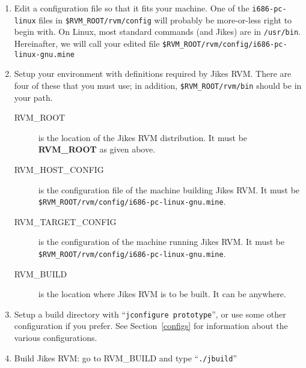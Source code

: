 \begin{enumerate}
\item Edit a configuration file so that it fits your machine.  One of
the {\tt i686-pc-linux} files in {\tt \$RVM\_ROOT/rvm/config} will probably be
more-or-less right to begin with.  On Linux, most standard commands
(and Jikes) are in {\tt /usr/bin}.  Hereinafter, we will call your edited
file {\tt \$RVM\_ROOT/rvm/config/i686-pc-linux-gnu.mine}

\item Setup your environment with definitions required by Jikes RVM.
There are four of these that you must use; in addition,
{\tt \$RVM\_ROOT/rvm/bin} should be in your path.
\begin{description}

\item[RVM\_ROOT] is the location of the Jikes RVM distribution.  It
must be {\bf RVM\_ROOT} as given above.

\item[RVM\_HOST\_CONFIG] is the configuration file of the machine
building Jikes RVM.  It must be
{\tt \$RVM\_ROOT/rvm/config/i686-pc-linux-gnu.mine}.

\item[RVM\_TARGET\_CONFIG] is the configuration of the machine running
Jikes RVM.  It must be {\tt \$RVM\_ROOT/rvm/config/i686-pc-linux-gnu.mine}.

\item[RVM\_BUILD] is the location where Jikes RVM is to be built.  It
can be anywhere.
\end{description}

\item Setup a build directory with ``{\tt jconfigure prototype}'', or
use some other configuration if you prefer. See Section~\ref{configs}
for information about the various configurations.

\item Build Jikes RVM: go to RVM\_BUILD and type ``{\tt ./jbuild}''

\end{enumerate}

\newcommand{\gccURL}{ftp://ftp.gnu.org/gnu/gcc}
\newcommand{\glibcURL}{ftp://ftp.gnu.org/gnu/glibc}
\newcommand{\makeURL}{ftp://ftp.gnu.org/gnu/make}
\newcommand{\bashURL}{ftp://ftp.gnu.org/gnu/bash}
\newcommand{\tarURL}{ftp://ftp.gnu.org/gnu/tar}
\newcommand{\autoconfURL}{ftp://ftp.gnu.org/gnu/autoconf}
\newcommand{\automakeURL}{ftp://ftp.gnu.org/gnu/automake}
\newcommand{\linuxPPCJDKURL}{http://www.ibm.com/java/jdk/linux/index.html}
\newcommand{\linuxKernelURL}{http://www.kernel.org}

